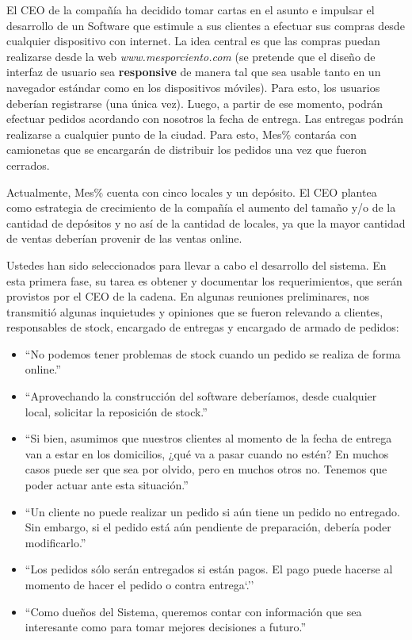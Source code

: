 \documentclass[11pt, a4paper, twoside]{article}
\begin{document}
El CEO de la compañía ha decidido tomar cartas en el asunto e impulsar el
desarrollo de un Software que estimule a sus clientes a efectuar sus compras
desde cualquier dispositivo con internet. La idea central es que las compras
puedan realizarse desde la web \textit{www.mesporciento.com} (se pretende que el
diseño de interfaz de usuario sea \textbf{responsive} de manera tal que sea
usable tanto en un navegador estándar como en los dispositivos móviles). Para
esto, los usuarios deberían registrarse (una única vez). Luego, a partir de ese
momento, podrán efectuar pedidos acordando con nosotros la fecha de entrega. Las
entregas podrán realizarse a cualquier punto de la ciudad. Para esto, Mes\%
contaráa con camionetas que se encargarán de distribuir los pedidos una vez que
fueron cerrados.

Actualmente, Mes\% cuenta con cinco locales y un depósito. El CEO plantea como
estrategia de crecimiento de la compañía el aumento del tamaño y/o de la
cantidad de depósitos y no así de la cantidad de locales, ya que la mayor
cantidad de ventas deberían provenir de las ventas online.

Ustedes han sido seleccionados para llevar a cabo el desarrollo del sistema. En
esta primera fase, su tarea es obtener y documentar los requerimientos, que
serán provistos por el CEO de la cadena. En algunas reuniones preliminares, nos
transmitió algunas inquietudes y opiniones que se fueron relevando a clientes,
responsables de stock, encargado de entregas y encargado de armado de pedidos:

\begin{itemize}

\item ``No podemos tener problemas de stock cuando un pedido se realiza de forma
online.''

\item ``Aprovechando la construcción del software deberíamos, desde cualquier
local, solicitar la reposición de stock.''

\item ``Si bien, asumimos que nuestros clientes al momento de la fecha de
entrega van a estar en los domicilios, ¿qué va a pasar cuando no estén? En
muchos casos puede ser que sea por olvido, pero en muchos otros no. Tenemos que
poder actuar ante esta situación.''

\item ``Un cliente no puede realizar un pedido si aún tiene un pedido no
entregado. Sin embargo, si el pedido está aún pendiente de preparación, debería
poder modificarlo.''

\item ``Los pedidos sólo serán entregados si están pagos. El pago puede hacerse
al momento de hacer el pedido o contra entrega`.''

\item ``Como dueños del Sistema, queremos contar con información que sea
interesante como para tomar mejores decisiones a futuro.''

\end{itemize}
\end{document}
